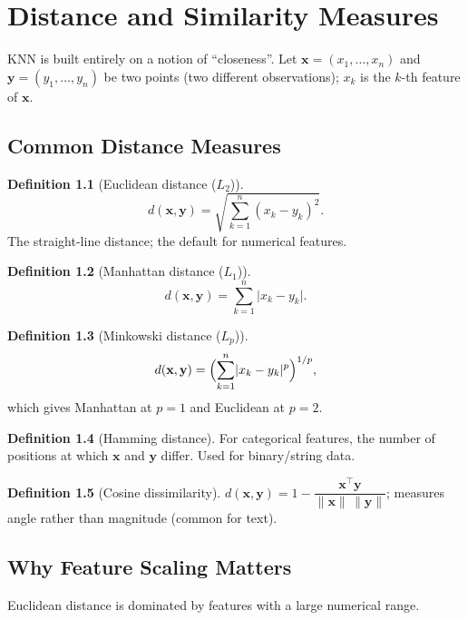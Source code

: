 \documentclass[11pt,a4paper]{report}
\theoremstyle{definition}
\newtheorem{definition}{Definition}[chapter]
\theoremstyle{remark}
\newcommand{\vx}{\mathbf{x}}
\newcommand{\vy}{\mathbf{y}}
\begin{document}
	\chapter{Distance and Similarity Measures}
	
	KNN is built entirely on a notion of ``closeness''. Let
	$\vx=(x_1,\dots,x_n)$ and $\vy=(y_1,\dots,y_n)$ be two points (two different
	observations); $x_k$ is the $k$-th feature of $\vx$.
	
	\section{Common Distance Measures}
	\begin{definition}[Euclidean distance ($L_2$)]
		\begin{equation}
			d(\vx,\vy)=\sqrt{\sum_{k=1}^{n}(x_k-y_k)^2}.
			\label{eq:euclid}
		\end{equation}
		The straight-line distance; the default for numerical features.
	\end{definition}
	\begin{definition}[Manhattan distance ($L_1$)]
		\[ d(\vx,\vy)=\sum_{k=1}^{n}\lvert x_k-y_k\rvert . \]
	\end{definition}
	\begin{definition}[Minkowski distance ($L_p$)]
		\[ d(\vx,\vy)=\Bigl(\sum_{k=1}^{n}\lvert x_k-y_k\rvert^{p}\Bigr)^{1/p}, \]
		which gives Manhattan at $p=1$ and Euclidean at $p=2$.
	\end{definition}
	\begin{definition}[Hamming distance]
		For categorical features, the number of positions at which $\vx$ and $\vy$
		differ. Used for binary/string data.
	\end{definition}
	\begin{definition}[Cosine dissimilarity]
		$d(\vx,\vy)=1-\dfrac{\vx^{\!\top}\vy}{\lVert\vx\rVert\,\lVert\vy\rVert}$; measures
		angle rather than magnitude (common for text).
	\end{definition}
	
	\section{Why Feature Scaling Matters}
	\label{sec:scaling}
	Euclidean distance is dominated by features with a large numerical range.
	
\end{document}
